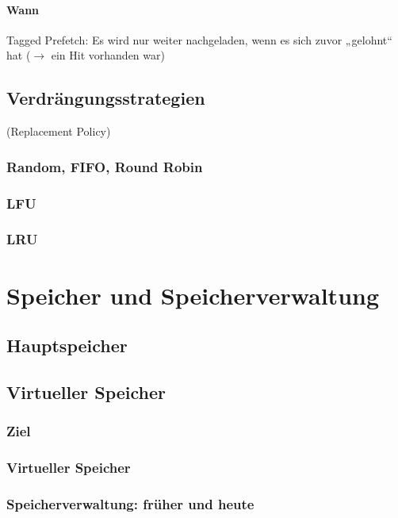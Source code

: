 \subsubsection*{Wann}
Tagged Prefetch: Es wird nur weiter nachgeladen, wenn es sich zuvor „gelohnt“ hat ($\to$ ein Hit vorhanden war)

\section{Verdrängungsstrategien}
(Replacement Policy)
\subsection{Random, FIFO, Round Robin}
\subsection{LFU}
\subsection{LRU}

\chapter{Speicher und Speicherverwaltung}
\section*{Hauptspeicher}
\section{Virtueller Speicher}
\subsection{Ziel}
\subsection{Virtueller Speicher}
\subsection{Speicherverwaltung: früher und heute}
